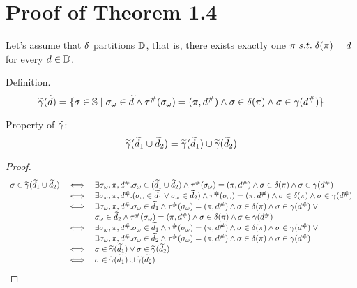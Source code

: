 \section{Proof of Theorem 1.4}\label{sec:proof}

Let's assume that $\delta$ partitions $\mathbb{D}$, that is,
there exists exactly one $\pi\ s.t. \; \delta(\pi)=d$
for every $d \in \mathbb{D}$.

\bigskip

Definition.
\[
  \widetilde{\gamma}(\widetilde{d}) = \{
    \sigma \in \mathbb{S} \mid
    {\sigma}_\omega \in \widetilde{d} \wedge
    {\tau}^{\#}({\sigma}_\omega) = (\pi, {d}^{\#}) \wedge
    \sigma \in \delta(\pi) \wedge
    \sigma \in \gamma({d}^{\#})
  \}
\]

Property of $\widetilde{\gamma}$:
\[
  \widetilde{\gamma}(\widetilde{d}_1 \cup \widetilde{d}_2) = \widetilde{\gamma}(\widetilde{d}_1) \cup \widetilde{\gamma}(\widetilde{d}_2)
\]

\begin{proof}

\[
  \begin{array}{rcl}
    \sigma \in \widetilde{\gamma}(\widetilde{d}_1 \cup \widetilde{d}_2)
    &\iff& \exists {\sigma}_\omega,\pi,{d}^{\#}. {\sigma}_\omega \in (\widetilde{d}_1 \cup \widetilde{d}_2) \wedge
      {\tau}^{\#}({\sigma}_\omega) = (\pi, {d}^{\#}) \wedge
      \sigma \in \delta(\pi) \wedge
      \sigma \in \gamma({d}^{\#}) \\
    &\iff& \exists {\sigma}_\omega,\pi,{d}^{\#}. ({\sigma}_\omega \in \widetilde{d}_1 \lor {\sigma}_\omega \in \widetilde{d}_2) \wedge
      {\tau}^{\#}({\sigma}_\omega) = (\pi, {d}^{\#}) \wedge
      \sigma \in \delta(\pi) \wedge
      \sigma \in \gamma({d}^{\#}) \\
    &\iff& \exists {\sigma}_\omega,\pi,{d}^{\#}. {\sigma}_\omega \in \widetilde{d}_1 \wedge
      {\tau}^{\#}({\sigma}_\omega) = (\pi, {d}^{\#}) \wedge
      \sigma \in \delta(\pi) \wedge
      \sigma \in \gamma({d}^{\#}) \; \lor\\
    && {\sigma}_\omega \in \widetilde{d}_2 \wedge
      {\tau}^{\#}({\sigma}_\omega) = (\pi, {d}^{\#}) \wedge
      \sigma \in \delta(\pi) \wedge
      \sigma \in \gamma({d}^{\#}) \\
    &\iff& \exists {\sigma}_\omega,\pi,{d}^{\#}. {\sigma}_\omega \in \widetilde{d}_1 \wedge
      {\tau}^{\#}({\sigma}_\omega) = (\pi, {d}^{\#}) \wedge
      \sigma \in \delta(\pi) \wedge
      \sigma \in \gamma({d}^{\#}) \; \lor \\
    && \exists {\sigma}_\omega,\pi,{d}^{\#}. {\sigma}_\omega \in \widetilde{d}_2 \wedge
      {\tau}^{\#}({\sigma}_\omega) = (\pi, {d}^{\#}) \wedge
      \sigma \in \delta(\pi) \wedge
      \sigma \in \gamma({d}^{\#}) \\
    &\iff& \sigma \in \widetilde{\gamma}(\widetilde{d}_1) \lor \sigma \in \widetilde{\gamma}(\widetilde{d}_2) \\
    &\iff& \sigma \in \widetilde{\gamma}(\widetilde{d}_1) \cup \widetilde{\gamma}(\widetilde{d}_2)
  \end{array}
\]
\end{proof}

